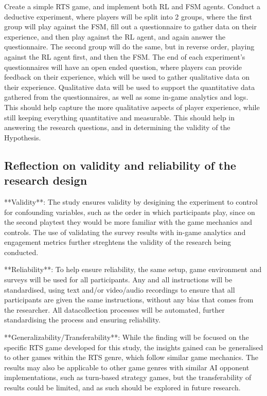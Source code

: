 \documentclass[conference]{IEEEtran}
\begin{document}
Create a simple RTS game, and implement both RL and FSM agents. Conduct a deductive experiment, where players will be split into 2 groups,
where the first group will play against the FSM, fill out a questionnaire to gather data on their experience, and then play against the RL agent,
and again answer the questionnaire. The second group will do the same, but in reverse order, playing against the RL agent first, and then the FSM.
The end of each experiment's questionnaires will have an open ended question, where players can provide feedback on their experience,
which will be used to gather qualitative data on their experience. Qualitative data will be used to support the quantitative data gathered from
the questionnaires, as well as some in-game analytics and logs. This should help capture the more qualitative aspects of player experience,
while still keeping everything quantitative and measurable. This should help in answering the research questions, and in determining the validity
of the Hypothesis.

\subsection{Reflection on validity and reliability of the research design}

**Validity**: The study ensures validity by desigining the experiment to control for confounding variables, such as the order in which participants play, since on the second playtest they would be more
familiar with the game mechanics and controls. The use of validating the survey results with in-game analytics and engagement metrics further streghtens the validity of the research being conducted.

**Reliability**: To help ensure reliability, the same setup, game environment and surveys will be used for all participants. Any and all instructions will be standardised, using text and/or video/audio
recordings to ensure that all participants are given the same instructions, without any bias that comes from the researcher. All datacollection processes will be automated, further standardising the process
and ensuring reliability.

**Generalizability/Transferability**: While the finding will be focused on the specific RTS game developed for this study, the insights gained can be generalised to other games within the RTS genre,
which follow similar game mechanics. The results may also be applicable to other game genres with similar AI opponent implementations, such as turn-based strategy games, but the transferability
of results could be limited, and as such should be explored in future research.
\end{document}
